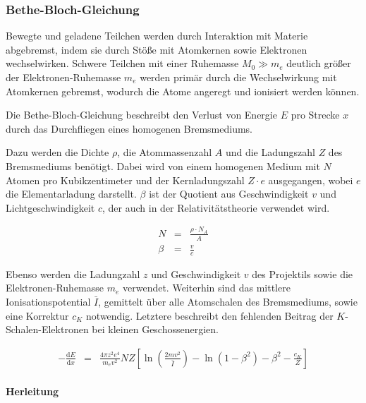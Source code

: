 \documentclass[12pt,a4paper]{scrartcl}
\numberwithin{equation}{section} %
\renewcommand{\[}{} %
\renewcommand{\]}{\noindent} %
\begin{document}
\hypertarget{bethe-bloch-gleichung}{%
\subsubsection{Bethe-Bloch-Gleichung}\label{bethe-bloch-gleichung}}

Bewegte und geladene Teilchen werden durch Interaktion mit Materie
abgebremst, indem sie durch Stöße mit Atomkernen sowie Elektronen
wechselwirken. Schwere Teilchen mit einer Ruhemasse \(M_0\gg m_e\)
deutlich größer der Elektronen-Ruhemasse \(m_e\) werden primär durch die
Wechselwirkung mit Atomkernen gebremst, wodurch die Atome angeregt und
ionisiert werden können.

Die Bethe-Bloch-Gleichung beschreibt den Verlust von Energie \(E\) pro
Strecke \(x\) durch das Durchfliegen eines homogenen Bremsmediums.

Dazu werden die Dichte \(\rho\), die Atommassenzahl \(A\) und die
Ladungszahl \(Z\) des Bremsmediums benötigt. Dabei wird von einem
homogenen Medium mit \(N\) Atomen pro Kubikzentimeter und der
Kernladungszahl \(Z\cdot e\) ausgegangen, wobei \(e\) die
Elementarladung darstellt. \(\beta\) ist der Quotient aus
Geschwindigkeit \(v\) und Lichtgeschwindigkeit \(c\), der auch in der
Relativitätstheorie verwendet wird.

\[
\begin{eqnarray}
    N &=& \frac{\rho\cdot N_A}{A} \\
    \beta &=& \frac{v}{c}
\end{eqnarray}
\]

Ebenso werden die Ladungzahl \(z\) und Geschwindigkeit \(v\) des
Projektils sowie die Elektronen-Ruhemasse \(m_e\) verwendet. Weiterhin
sind das mittlere Ionisationspotential \(\bar I\), gemittelt über alle
Atomschalen des Bremsmediums, sowie eine Korrektur \(c_K\) notwendig.
Letztere beschreibt den fehlenden Beitrag der \(K\)-Schalen-Elektronen
bei kleinen Geschossenergien.

\[
\begin{eqnarray}
    -\frac{\mathrm dE}{\mathrm dx} &=&
        \frac{4\pi z^2 e^4}{m_e v^2} NZ
        \left[
            \ln\left(\frac{2mv^2}{\bar I}\right)
            - \ln\left(1 - \beta^2\right)
            - \beta^2
            - \frac{c_K}{Z}
        \right]
        \label{BetheBloch}
\end{eqnarray}
\]

\hypertarget{herleitung}{%
\paragraph{Herleitung}\label{herleitung}}
\end{document}

